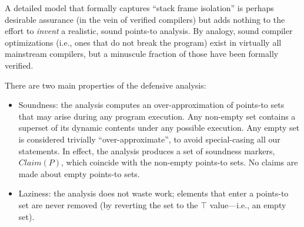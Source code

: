 A detailed model that formally captures ``stack frame isolation'' is perhaps desirable assurance (in the vein of verified compilers) but adds nothing to the effort to \emph{invent} a realistic, sound points-to analysis. By analogy, sound compiler optimizations (i.e., ones that do not break the program) exist in virtually all mainstream compilers, but a minuscule fraction of those have been formally verified.

There are two main properties of the defensive analysis: 

\begin{itemize}
\item Soundness: the analysis computes an over-approximation of points-to sets that may arise during any program execution. Any non-empty set contains a superset of its dynamic contents under any possible execution. Any empty set is considered trivially ``over-approximate'', to avoid special-casing all our statements. In effect, the analysis produces a set of soundness markers, $Claim(P)$, which coincide with the non-empty points-to sets. No claims are made about empty points-to sets.

\item Laziness: the analysis does not waste work; elements that enter a points-to set are never removed (by reverting the set to the $\top$ value---i.e., an empty set).
\end{itemize}


